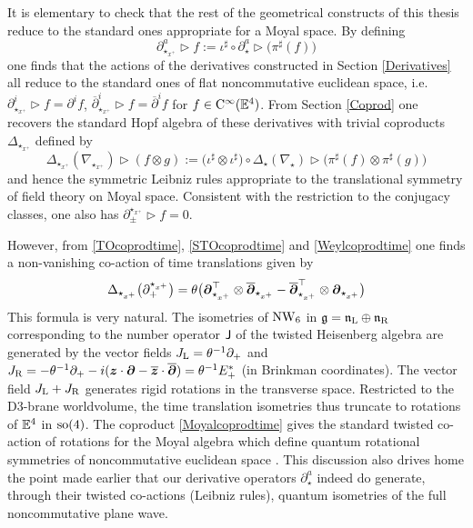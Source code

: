 It is elementary to check that the rest of the geometrical constructs of this
thesis reduce to the standard ones appropriate for a Moyal space. By defining
\begin{equation}
  \label{derivxpdef}
  \partial_{\star_{x^+}}^a\triangleright
  f:=\iota^\sharp\circ\partial_\star^a\triangleright\bigl(\pi^\sharp(f)\bigr)
\end{equation}
one finds that the actions of the derivatives constructed in Section
\ref{Derivatives} all reduce to the standard ones of flat noncommutative
euclidean space, i.e. $\partial_{\star_{x^+}}^i\triangleright f=\partial^if$,
$\overline{\partial}^{ i}_{\star_{x^+}}\triangleright f=\overline{\partial}^{
  i}f$ for $f\in{\rm C}^\infty({\mathbb E}^4)$. From Section \ref{Coprod} one recovers the
standard Hopf algebra of these derivatives with trivial coproducts
$\Delta_{\star_{x^+}}$ defined by
\begin{equation}
  \label{Deltaxpdef}
  \Delta_{\star_{x^+}}(\nabla_{\star_{x^+}})\triangleright
  (f\otimes g):=\bigl(\iota^\sharp\otimes\iota^\sharp\bigr)\circ
  \Delta_\star(\nabla_\star)
  \triangleright\bigl(\pi^\sharp(f)\otimes\pi^\sharp(g)\bigr)  
\end{equation}
and hence the symmetric Leibniz rules appropriate to the translational symmetry
of field theory on Moyal space. Consistent with the restriction to the conjugacy
classes, one also has $\partial_\pm^{\star_{x^+}}\triangleright f=0$.

However, from \eqref{TOcoprodtime}, \eqref{STOcoprodtime} and
\eqref{Weylcoprodtime} one finds a non-vanishing co-action of time translations
given by
\begin{equation}
  \label{Moyalcoprodtime}
  \Delta_{\star_{x^+}}\bigl(\partial_+^{\star_{x^+}}\bigr)=
  \theta \bigl({{\boldsymbol {\partial} }}_{\star_{x^+}}^\top\otimes
  \overline{{{\boldsymbol {\partial} }}}_{\star_{x^+}}-
  \overline{{{\boldsymbol {\partial} }}}_{\star_{x^+}}^\top\otimes{{\boldsymbol {\partial} }}_{\star_{x^+}}\bigr)  
\end{equation}
This formula is very natural. The isometries of $\operatorname{NW}_6$ in ${\mathfrak g}={\mathfrak n}_{\rm
  L}\oplus{\mathfrak n}_{\rm R}$ corresponding to the number operator ${\sf J}$ of the twisted
Heisenberg algebra are generated by the vector fields $J_{\rm
  L}=\theta^{-1} \partial_+$ and $J_{\rm R}=-\theta^{-1} \partial_+- i
({{\boldsymbol {z} }}\cdot{{\boldsymbol {\partial} }}- \overline{{{\boldsymbol {z} }}}\cdot\overline{{{\boldsymbol {\partial} }}} )=\theta^{-1} E_+^*$ (in
Brinkman coordinates). The vector field $J_{\rm L}+J_{\rm R}$ generates rigid
rotations in the transverse space. Restricted to the D3-brane worldvolume, the
time translation isometries thus truncate to rotations of ${\mathbb E}^4$ in ${\rm
  so}(4)$. The coproduct \eqref{Moyalcoprodtime} gives the standard twisted
co-action of rotations for the Moyal algebra which define quantum rotational
symmetries of noncommutative euclidean space \cite{CPT1,CKNT1,Wess1}. This
discussion also drives home the point made earlier that our derivative operators
$\partial_\star^a$ indeed do generate, through their twisted co-actions (Leibniz
rules), quantum isometries of the full noncommutative plane wave.

